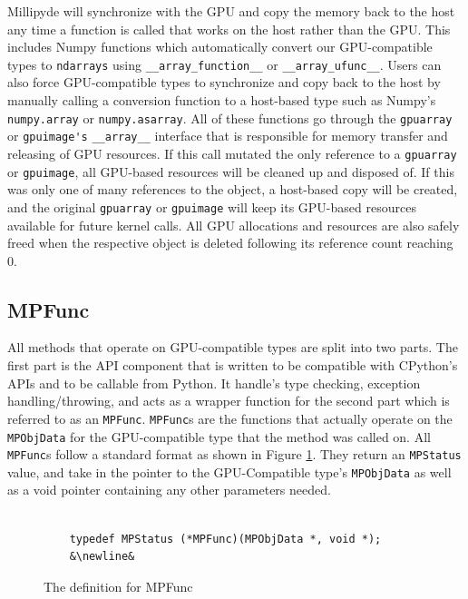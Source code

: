 \quad Millipyde will synchronize with the GPU and copy the memory back to the host any time a function is called that works on the host rather than the GPU. This includes Numpy functions which automatically convert our GPU-compatible types to \verb|ndarrays| using \verb|__array_function__| or \verb|__array_ufunc__|. Users can also force GPU-compatible types to synchronize and copy back to the host by manually calling a conversion function to a host-based type such as Numpy's \verb|numpy.array| or \verb|numpy.asarray|. All of these functions go through the \verb|gpuarray| or \verb|gpuimage's| \verb|__array__| interface that is responsible for memory transfer and releasing of GPU resources. If this call mutated the only reference to a \verb|gpuarray| or \verb|gpuimage|, all GPU-based resources will be cleaned up and disposed of. If this was only one of many references to the object, a host-based copy will be created, and the original \verb|gpuarray| or \verb|gpuimage| will keep its GPU-based resources available for future kernel calls. All GPU allocations and resources are also safely freed when the respective object is deleted following its reference count reaching 0.

\subsection{MPFunc}

All methods that operate on GPU-compatible types are split into two parts. The first part is the API component that is written to be compatible with CPython's APIs and to be callable from Python. It handle's type checking, exception handling/throwing, and acts as a wrapper function for the second part which is referred to as an \verb|MPFunc|. \verb|MPFunc|s are the functions that actually operate on the \verb|MPObjData| for the GPU-compatible type that the method was called on. All \verb|MPFunc|s follow a standard format as shown in Figure \ref{mpfunc}. They return an \verb|MPStatus| value, and take in the pointer to the GPU-Compatible type's \verb|MPObjData| as well as a void pointer containing any other parameters needed. 

\begin{figure}[hbtp]
    \begin{lstlisting}
    
    typedef MPStatus (*MPFunc)(MPObjData *, void *);
    &\newline&
    \end{lstlisting}
    \caption{The definition for MPFunc}
    \label{mpfunc}
\end{figure}

